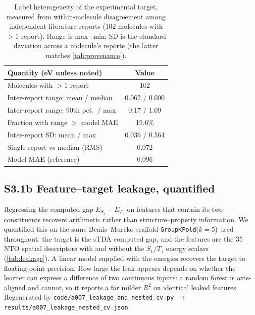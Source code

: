 \documentclass[twoside,twocolumn,9pt]{extarticle}
\begin{document}
\begin{table}[htbp]
  \centering
  \caption{Label heterogeneity of the experimental target, measured from
    within-molecule disagreement among independent literature reports
    (\num{102} molecules with $>1$ report). Range is max$-$min; SD is the standard
    deviation across a molecule's reports (the latter matches \cref{tab:provenance}).}
  \label{tab:solvent}
  \footnotesize
  \begin{tabular}{lc}
    \toprule
    Quantity (eV unless noted) & Value \\
    \midrule
    Molecules with $>1$ report                 & 102 \\
    Inter-report range: mean / median          & 0.062 / 0.000 \\
    Inter-report range: 90th pct.\ / max       & 0.17 / 1.09 \\
    Fraction with range $>$ model MAE          & 19.6\% \\
    Inter-report SD: mean / max                & 0.036 / 0.564 \\
    Single report vs median (RMS)              & 0.072 \\
    \midrule
    Model MAE (reference)                      & 0.096 \\
    \bottomrule
  \end{tabular}
\end{table}

\subsection*{S3.1b Feature--target leakage, quantified}
Regressing the computed gap $E_{S_1}-E_{T_1}$ on features that contain its two
constituents recovers arithmetic rather than structure--property information. We
quantified this on the same Bemis--Murcko scaffold \texttt{GroupKFold}($k=5$) used
throughout: the target is the sTDA computed gap, and the features are the \num{35} NTO
spatial descriptors with and without the $S_1$/$T_1$ energy scalars
(\cref{tab:leakage}). A linear model supplied with the energies recovers the target to
floating-point precision. How large the leak appears depends on whether the learner can
express a difference of two continuous inputs: a random forest is axis-aligned and
cannot, so it reports a far milder $R^2$ on identical leaked features. Regenerated by
\texttt{code/a007\_leakage\_and\_nested\_cv.py} $\rightarrow$
\texttt{results/a007\_leakage\_nested\_cv.json}.
\end{document}
